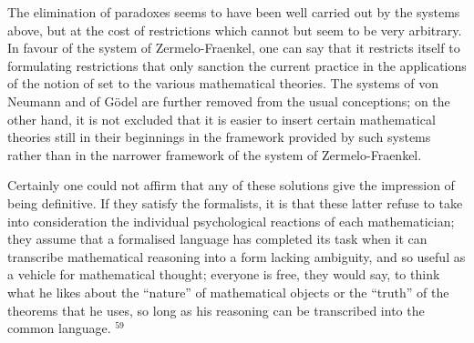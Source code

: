 The elimination of paradoxes seems to have been well carried out by the systems above, but at the cost of restrictions which cannot but seem to be very arbitrary. In favour of the system of Zermelo-Fraenkel, one can say that it restricts itself to formulating restrictions that only sanction the current practice in the applications of the notion of set to the various mathematical theories. The systems of von Neumann and of Gödel are further removed from the usual conceptions; on the other hand, it is not excluded that it is easier to insert certain mathematical theories still in their beginnings in the framework provided by such systems rather than in the narrower framework of the system of Zermelo-Fraenkel.

Certainly one could not affirm that any of these solutions give the impression of being definitive. If they satisfy the formalists, it is that these latter refuse to take into consideration the individual psychological reactions of each mathematician; they assume that a formalised language has completed its task when it can transcribe mathematical reasoning into a form lacking ambiguity, and so useful as a vehicle for mathematical thought; everyone is free, they would say, to think what he likes about the ``nature'' of mathematical objects or the ``truth'' of the theorems that he uses, so long as his reasoning can be transcribed into the common language. \(^{59}\)

